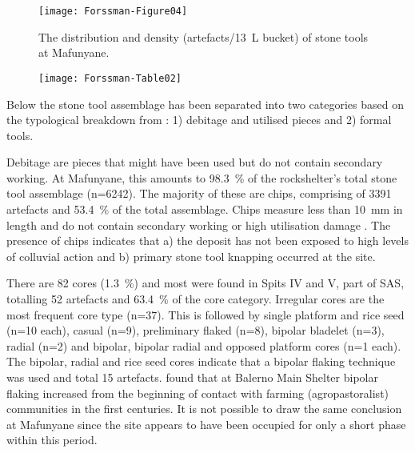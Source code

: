 	\begin{figure} %
		\texttt{[image: Forssman-Figure04]}
		\caption{The distribution and density (artefacts/\SI{13}{\liter} bucket) of stone tools at Mafunyane.}
		\label{fig:Forssman-Figure04}
	\end{figure}

	\begin{figure} %
		\texttt{[image: Forssman-Table02]}
		\label{fig:Forssman-Table02}
	\end{figure}

Below the stone tool assemblage has been separated into two categories based on the typological breakdown from \textcite{Walker_1994}: 1) debitage and utilised pieces and 2) formal tools.

Debitage are  pieces that might have been used but do not contain secondary working. 
At Mafunyane, this amounts to \SI{98.3}{\percent} of the rockshelter’s total stone tool assemblage (n=\num{6242}). 
The majority of these are chips, comprising of \num{3391} artefacts and \SI{53.4}{\percent} of the total assemblage. 
Chips measure less than \SI{10}{\milli\meter}
  in length and do not contain secondary working or high utilisation damage \parencite[see][]{Deacon_1984a}. 
 The presence of chips indicates that a) the deposit has not been exposed to high levels of colluvial action \parencite{Kuman_2009} and b) primary stone tool knapping occurred at the site.

There are 82 cores (\SI{1.3}{\percent}) and most were found in Spits IV and V, part of SAS, totalling 52 artefacts and \SI{63.4}{\percent} of the core category. 
Irregular cores are the most frequent core type (n=37). 
This is followed by single platform and rice seed (n=10 each), casual (n=9), preliminary flaked (n=8), bipolar bladelet (n=3), radial (n=2) and bipolar, bipolar radial and opposed platform cores (n=1 each). 
The bipolar, radial and rice seed cores indicate that a bipolar flaking technique was used \parencite[see][]{vanDoornum_2005}
 and total 15 artefacts. 
 \textcite[259]{vanDoornum_2008} found that at Balerno Main Shelter bipolar flaking increased from the beginning of contact with farming (agropastoralist) communities in the first centuries\AD. 
 It is not possible to draw the same conclusion at Mafunyane since the site appears to have been occupied for only a short phase within this period.
 
